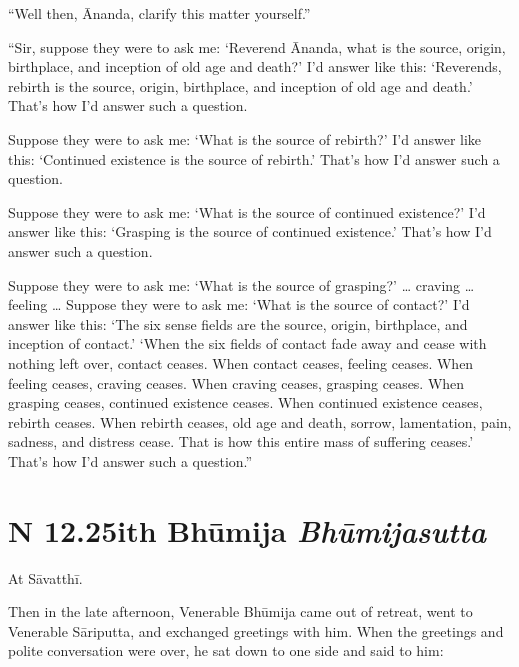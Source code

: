 \documentclass[12pt,openany]{book}%
\newcommand*{\suttatitleacronym}[1]{\smaller[2]{#1}\vspace*{.3em}}
\newcommand*{\suttatitletranslation}[1]{\linebreak{#1}}
\newcommand*{\suttatitleroot}[1]{\linebreak\smaller[2]\itshape{#1}}
\newcommand*{\tocacronym}[1]{\hspace*{-3.3em}{#1}\quad}
\newcommand*{\toctranslation}[1]{#1}
\newcommand*{\tocroot}[1]{(\textit{#1})}
\begin{document}
“Well then, Ānanda, clarify this matter yourself.” 

“Sir, suppose they were to ask me: ‘Reverend Ānanda, what is the source, origin, birthplace, and inception of old age and death?’ I’d answer like this: ‘Reverends, rebirth is the source, origin, birthplace, and inception of old age and death.’ That’s how I’d answer such a question. 

Suppose they were to ask me: ‘What is the source of rebirth?’ I’d answer like this: ‘Continued existence is the source of rebirth.’ That’s how I’d answer such a question. 

Suppose they were to ask me: ‘What is the source of continued existence?’ I’d answer like this: ‘Grasping is the source of continued existence.’ That’s how I’d answer such a question. 

Suppose they were to ask me: ‘What is the source of grasping?’ … craving … feeling … Suppose they were to ask me: ‘What is the source of contact?’ I’d answer like this: ‘The six sense fields are the source, origin, birthplace, and inception of contact.’ ‘When the six fields of contact fade away and cease with nothing left over, contact ceases. When contact ceases, feeling ceases. When feeling ceases, craving ceases. When craving ceases, grasping ceases. When grasping ceases, continued existence ceases. When continued existence ceases, rebirth ceases. When rebirth ceases, old age and death, sorrow, lamentation, pain, sadness, and distress cease. That is how this entire mass of suffering ceases.’ That’s how I’d answer such a question.” 

%
\section*{{\suttatitleacronym SN 12.25}{\suttatitletranslation With Bhūmija }{\suttatitleroot Bhūmijasutta}}
\addcontentsline{toc}{section}{\tocacronym{SN 12.25} \toctranslation{With Bhūmija } \tocroot{Bhūmijasutta}}

At \textsanskrit{Sāvatthī}. 

Then in the late afternoon, Venerable \textsanskrit{Bhūmija} came out of retreat, went to Venerable \textsanskrit{Sāriputta}, and exchanged greetings with him. When the greetings and polite conversation were over, he sat down to one side and said to him: 
\end{document}

